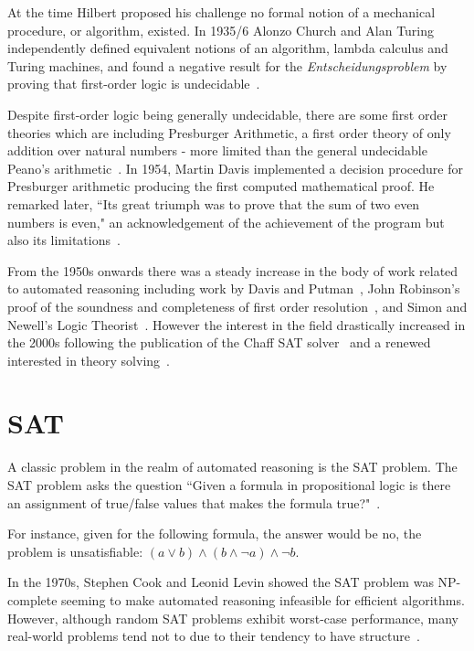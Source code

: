 \documentclass[]{final_report}
\begin{document}
At the time Hilbert proposed his challenge no formal notion of a mechanical procedure, or algorithm, existed. In 1935/6 Alonzo Church and Alan Turing independently defined equivalent notions of an algorithm, lambda calculus and Turing machines, and found a negative result for the \textit{Entscheidungsproblem} by proving that first-order logic is undecidable~\cite{turingchurchproof}.

Despite first-order logic being generally undecidable, there are some first order theories which are including Presburger Arithmetic, a first order theory of only addition over natural numbers - more limited than the general undecidable Peano's arithmetic~\cite{automatedreasoningbooklet2004}. In 1954, Martin Davis implemented a decision procedure for Presburger arithmetic producing the first computed mathematical proof. He remarked later, ``Its great triumph was to prove that the sum of two even numbers is even," an acknowledgement of the achievement of the program but also its limitations~\cite{excapebarrettriseofsmt, automatedreasoningbooklet2004}.

From the 1950s onwards there was a steady increase in the body of work related to automated reasoning including work by Davis and Putman~\cite{Davis:1960:CPQ:321033.321034,Davis:1962:MPT:368273.368557}, John Robinson's proof of the soundness and completeness of first order resolution~\cite{robinson1965machine}, and Simon and Newell's Logic Theorist~\cite{newell1956logic}. However the interest in the field drastically increased in the 2000s following the publication of the Chaff SAT solver~\cite{moskewicz2001chaff} and a renewed interested in theory solving~\cite{excapebarrettriseofsmt}.

\section{SAT}
A classic problem in the realm of automated reasoning is the SAT problem. The SAT problem asks the question ``Given a formula in propositional logic is there an assignment of true/false values that makes the formula true?"~\cite{smtwheredowegofromhere}.

For instance, given for the following formula, the answer would be no, the problem is unsatisfiable: $(a \lor b) \land (b \land \lnot a) \land \lnot b $.

In the 1970s, Stephen Cook and Leonid Levin showed the SAT problem was NP-complete seeming to make automated reasoning infeasible for efficient algorithms. However, although random SAT problems exhibit worst-case performance, many real-world problems tend not to due to their tendency to have structure~\cite{smtwheredowegofromhere}.
\end{document}
